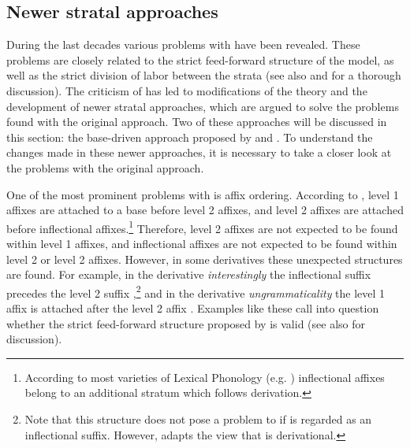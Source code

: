 \subsection{Newer stratal approaches}

During the last decades various problems with  have been revealed. These problems are closely related to the strict feed-forward structure of the model, as well as the strict division of labor between the strata (see also \citealt[Chapter 2]{Giegerich.1999} and \citealt[Chapter 7]{Plag.2003} for a thorough discussion). The criticism of  has led to modifications of the theory and the development of newer stratal approaches, which are argued to solve the problems found with the original approach. Two of these approaches will be discussed in this section: the base-driven approach proposed by \cite{Giegerich.1999} and . To understand the changes made in these newer approaches, it is necessary to take a closer look at the problems with the original approach.

One of the most prominent problems with  is affix ordering. According to , level 1 affixes are attached to a base before level 2 affixes, and level 2 affixes are attached before inflectional affixes.\footnote{According to most varieties of Lexical Phonology (e.g.  \citealt{Kiparsky.1982,Mohanan.1986}) inflectional affixes belong to an additional stratum which follows derivation.} Therefore, level 2 affixes are not expected to be found within level 1 affixes, and inflectional affixes are not expected to be found within level 2 or level 2 affixes. However, in some derivatives these unexpected structures are found. For example, in the derivative \textit{interestingly} the inflectional suffix  precedes the level 2 suffix ,\footnote{Note that this structure does not pose a problem to  if  is regarded as an inflectional suffix. However,  adapts the view that  is derivational. } and in the derivative \textit{ungrammaticality} the level 1 affix  is attached after the level 2 affix . Examples like these call into question whether the strict feed-forward structure proposed by  is valid (see also \citealt[Chapter 4]{Plag.1999} for discussion).

